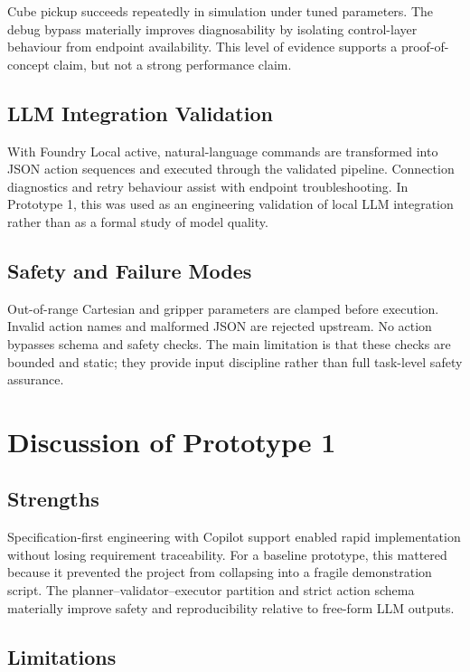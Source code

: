 \documentclass[12pt,a4paper]{article}
\begin{document}
Cube pickup succeeds repeatedly in simulation under tuned parameters. The debug bypass materially improves diagnosability by isolating control-layer behaviour from endpoint availability. This level of evidence supports a proof-of-concept claim, but not a strong performance claim.

\subsection{LLM Integration Validation}

With Foundry Local active, natural-language commands are transformed into JSON action sequences and executed through the validated pipeline. Connection diagnostics and retry behaviour assist with endpoint troubleshooting. In Prototype 1, this was used as an engineering validation of local LLM integration rather than as a formal study of model quality.

\subsection{Safety and Failure Modes}

Out-of-range Cartesian and gripper parameters are clamped before execution. Invalid action names and malformed JSON are rejected upstream. No action bypasses schema and safety checks. The main limitation is that these checks are bounded and static; they provide input discipline rather than full task-level safety assurance.

\section{Discussion of Prototype 1}

\subsection{Strengths}

Specification-first engineering with Copilot support enabled rapid implementation without losing requirement traceability. For a baseline prototype, this mattered because it prevented the project from collapsing into a fragile demonstration script. The planner--validator--executor partition and strict action schema materially improve safety and reproducibility relative to free-form LLM outputs.

\subsection{Limitations}
\end{document}
